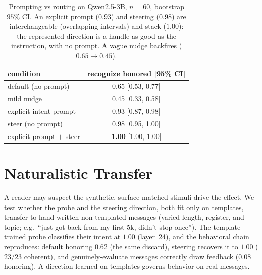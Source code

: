 \documentclass[11pt]{article}
\begin{document}
\begin{table}[t]
\centering\small
\begin{tabular}{lc}
\toprule
condition & recognize honored [95\% CI] \\
\midrule
default (no prompt) & 0.65 [0.53, 0.77] \\
mild nudge & 0.45 [0.33, 0.58] \\
explicit intent prompt & 0.93 [0.87, 0.98] \\
steer (no prompt) & 0.98 [0.95, 1.00] \\
explicit prompt $+$ steer & \textbf{1.00} [1.00, 1.00] \\
\bottomrule
\end{tabular}
\caption{Prompting vs routing on Qwen2.5-3B, $n{=}60$, bootstrap $95\%$ CI. An explicit prompt ($0.93$) and
steering ($0.98$) are interchangeable (overlapping intervals) and stack ($1.00$): the represented direction is
a handle as good as the instruction, with no prompt. A vague nudge backfires ($0.65 \to 0.45$).}
\label{tab:prompt}
\end{table}

\section{Naturalistic Transfer}
\label{sec:natural}
A reader may suspect the synthetic, surface-matched stimuli drive the effect. We test whether the probe and
the steering direction, both fit only on templates, transfer to hand-written non-templated messages (varied
length, register, and topic; e.g.\ ``just got back from my first 5k, didn't stop once''). The template-trained
probe classifies their intent at $1.00$ (layer~24), and the behavioral chain reproduces: default honoring
$0.62$ (the same discard), steering recovers it to $1.00$ ($23/23$ coherent), and genuinely-evaluate messages
correctly draw feedback ($0.08$ honoring). A direction learned on templates governs behavior on real messages.
\end{document}

